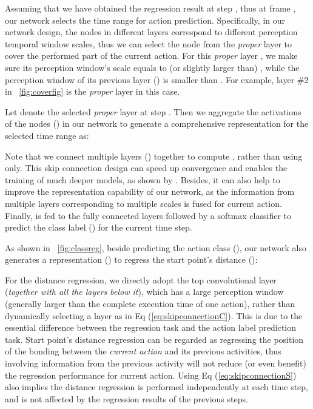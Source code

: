 \documentclass[10pt,twocolumn,letterpaper]{article}
\begin{document}
Assuming that we have obtained the regression result  at step ,
thus at frame , our network selects the time range  for action prediction. Specifically, in our network design, the nodes in different layers correspond to different perception temporal window scales,
thus we can select the node from the \emph{proper} layer to cover the performed part of the current action.
For this \emph{proper} layer , we make sure its perception window's scale equals to (or slightly larger than) ,
while the perception window of its previous layer () is smaller than .
For example, layer \#2 in \figurename{~\ref{fig:coverfig}} is the \emph{proper} layer in this case.


Let  denote the selected \emph{proper} layer at step .
Then we aggregate the activations of the nodes  () in our network to generate a comprehensive representation for the selected time range as:

Note that we connect multiple layers () together to compute ,
rather than using  only.
This skip connection design can speed up convergence and enables the training of much deeper models,
as shown by \cite{he2016deep,he2016identity}.
Besides, it can also help to improve the representation capability of our network,
as the information from multiple layers corresponding to multiple scales is fused for current action.
Finally,  is fed to the fully connected layers followed by a softmax classifier to predict the class label () for the current time step.


As shown in \figurename{~\ref{fig:classreg}}, beside predicting the action class (),
our network also generates a representation () to regress the start point's distance ():





For the distance regression, we directly adopt the top convolutional layer  (\emph{together with all the layers below it}),
which has a large perception window (generally larger than the complete execution time of one action),
rather than dynamically selecting a layer as in Eq (\ref{eq:skipconnectionC}).
This is due to the essential difference between the regression task and the action label prediction task.
Start point's distance regression can be regarded as regressing the position of the bonding \cite{liu2017manifold} between the \emph{current action} and its previous activities,
thus involving information from the previous activity will not reduce (or even benefit) the regression performance for current action.
Using Eq (\ref{eq:skipconnectionS}) also implies
the distance regression is performed independently at each time step,
and is not affected by the regression results of the previous steps.
\end{document}
